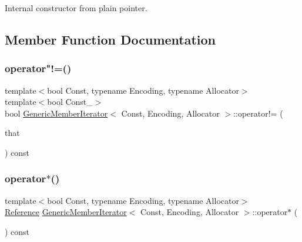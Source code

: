 Internal constructor from plain pointer. 



\subsection{Member Function Documentation}
\mbox{\label{classGenericMemberIterator_ad1d518be7ace72462fc77cd4c6f250e2}} 
\subsubsection{\texorpdfstring{operator"!=()}{operator!=()}}
{\footnotesize\ttfamily template$<$bool Const, typename Encoding, typename Allocator$>$ \\
template$<$bool Const\+\_\+$>$ \\
bool \hyperlink{classGenericMemberIterator}{Generic\+Member\+Iterator}$<$ Const, Encoding, Allocator $>$\+::operator!= (\begin{DoxyParamCaption}\item[{const \hyperlink{classGenericMemberIterator}{Generic\+Member\+Iterator}$<$ Const\+\_\+, Encoding, Allocator $>$ \&}]{that }\end{DoxyParamCaption}) const\hspace{0.3cm}{\ttfamily [inline]}}

\mbox{\label{classGenericMemberIterator_a56ad403f7e7a35d6060931685d6cbbe8}} 
\subsubsection{\texorpdfstring{operator$\ast$()}{operator*()}}
{\footnotesize\ttfamily template$<$bool Const, typename Encoding, typename Allocator$>$ \\
\hyperlink{classGenericMemberIterator_a8042a85a9e233d65de5b6c66d9a1109a}{Reference} \hyperlink{classGenericMemberIterator}{Generic\+Member\+Iterator}$<$ Const, Encoding, Allocator $>$\+::operator$\ast$ (\begin{DoxyParamCaption}{ }\end{DoxyParamCaption}) const\hspace{0.3cm}{\ttfamily [inline]}}

